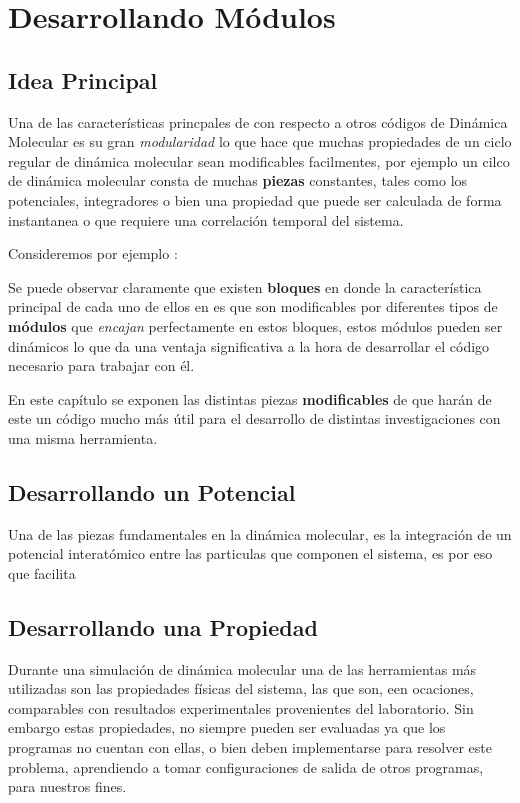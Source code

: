 \chapter{Desarrollando M\'odulos}
\label{chap:own}

\section{Idea Principal}

Una de las caracter\'isticas princpales de \lpmd con respecto a otros c\'odigos de Din\'amica Molecular es su gran \textit{modularidad} lo que hace que muchas propiedades de un ciclo regular de din\'amica molecular sean modificables facilmentes, por ejemplo un cilco de din\'amica molecular consta de muchas \textbf{piezas} constantes, tales como los potenciales, integradores o bien una propiedad que puede ser calculada de forma instantanea o que requiere una correlaci\'on temporal del sistema.

Consideremos por ejemplo :

Se puede observar claramente que existen \textbf{bloques} en donde la caracter\'istica principal de cada uno de ellos en \lpmd es que son modificables por diferentes tipos de \textbf{m\'odulos} que \textit{encajan} perfectamente en estos bloques, estos m\'odulos pueden ser din\'amicos lo que da una ventaja significativa a la hora de desarrollar el c\'odigo necesario para trabajar con \'el.

En este cap\'itulo se exponen las distintas piezas \textbf{modificables} de \lpmd que har\'an de este un c\'odigo mucho m\'as \'util para el desarrollo de distintas investigaciones con una misma herramienta.

\section{Desarrollando un Potencial}

Una de las piezas fundamentales en la din\'amica molecular, es la integraci\'on de un potencial interat\'omico entre las particulas que componen el sistema, es por eso que \lpmd facilita 

\section{Desarrollando una Propiedad}

Durante una simulaci\'on de din\'amica molecular una de las herramientas m\'as utilizadas  son las propiedades f\'isicas del sistema, las que son, een ocaciones, comparables con resultados experimentales provenientes del laboratorio. Sin embargo estas propiedades, no siempre pueden ser evaluadas ya que los programas no cuentan con ellas, o bien deben implementarse para resolver este problema, aprendiendo a tomar configuraciones de salida de otros programas, para nuestros fines.

